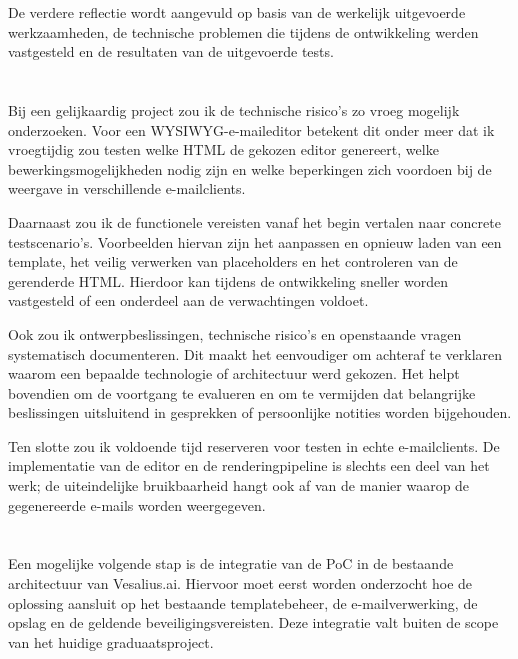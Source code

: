 De verdere reflectie wordt aangevuld op basis van de werkelijk uitgevoerde
werkzaamheden, de technische problemen die tijdens de ontwikkeling werden
vastgesteld en de resultaten van de uitgevoerde tests.

\section{}%
\label{sec:anders}
Bij een gelijkaardig project zou ik de technische risico's zo vroeg mogelijk
onderzoeken. Voor een WYSIWYG-e-maileditor betekent dit onder meer dat ik
vroegtijdig zou testen welke HTML de gekozen editor genereert, welke
bewerkingsmogelijkheden nodig zijn en welke beperkingen zich voordoen bij
de weergave in verschillende e-mailclients.

Daarnaast zou ik de functionele vereisten vanaf het begin vertalen naar
concrete testscenario's. Voorbeelden hiervan zijn het aanpassen en opnieuw
laden van een template, het veilig verwerken van placeholders en het
controleren van de gerenderde HTML. Hierdoor kan tijdens de ontwikkeling
sneller worden vastgesteld of een onderdeel aan de verwachtingen voldoet.

Ook zou ik ontwerpbeslissingen, technische risico's en openstaande vragen
systematisch documenteren. Dit maakt het eenvoudiger om achteraf te
verklaren waarom een bepaalde technologie of architectuur werd gekozen.
Het helpt bovendien om de voortgang te evalueren en om te vermijden dat
belangrijke beslissingen uitsluitend in gesprekken of persoonlijke notities
worden bijgehouden.

Ten slotte zou ik voldoende tijd reserveren voor testen in echte
e-mailclients. De implementatie van de editor en de renderingpipeline is
slechts een deel van het werk; de uiteindelijke bruikbaarheid hangt ook af
van de manier waarop de gegenereerde e-mails worden weergegeven.

\section{}%
\label{sec:verder-werk}
Een mogelijke volgende stap is de integratie van de PoC in de bestaande
architectuur van Vesalius.ai. Hiervoor moet eerst worden onderzocht hoe de
oplossing aansluit op het bestaande templatebeheer, de e-mailverwerking,
de opslag en de geldende beveiligingsvereisten. Deze integratie valt buiten
de scope van het huidige graduaatsproject.

